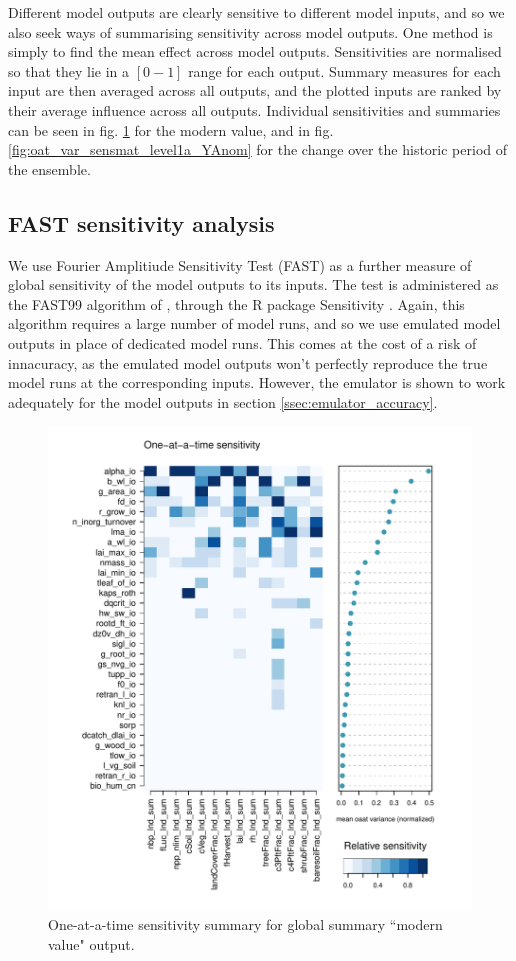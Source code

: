 \documentclass[gmd, manuscript]{copernicus}
\begin{document}
Different model outputs are clearly sensitive to different model inputs, and so we also seek ways of summarising sensitivity across model outputs. One method is simply to find the mean effect across model outputs. Sensitivities are normalised so that they lie in a $[0 -1]$ range for each output. Summary measures for each input are then averaged across all outputs, and the plotted inputs are ranked by their average influence across all outputs. Individual sensitivities and summaries can be seen in fig. \ref{fig:oat_var_sensmat_level1a_Y} for the modern value, and in fig. \ref{fig:oat_var_sensmat_level1a_YAnom} for the change over the historic period of the ensemble. 

\subsection{FAST sensitivity analysis}

We use Fourier Amplitiude Sensitivity Test (FAST) as a further measure of global sensitivity of the model outputs to its inputs. The test is administered as the FAST99 algorithm of \cite{Saltelli1999}, through the R package Sensitivity \citep{Rsensitivity}. Again, this algorithm requires a large number of model runs, and so we use emulated model outputs in place of dedicated model runs. This comes at the cost of a risk of innacuracy, as the emulated model outputs won't perfectly reproduce the true model runs at the corresponding inputs. However, the emulator is shown to work adequately for the model outputs in section \ref{ssec:emulator_accuracy}. 



\begin{figure}[t]
\includegraphics[width=12cm]{./graphics/oat_var_sensmat_level1a_Y}
\caption{One-at-a-time sensitivity summary for global summary ``modern value" output.}
\label{fig:oat_var_sensmat_level1a_Y}
\end{figure}
\end{document}
